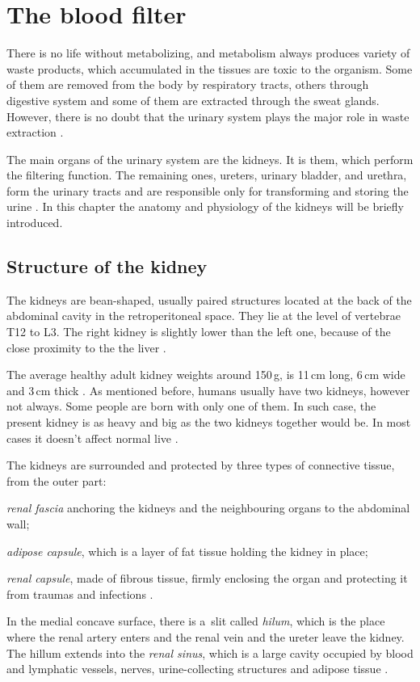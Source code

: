 \chapter{The blood filter}
	
There is no life without metabolizing, and metabolism always produces variety of waste products, which accumulated in the tissues are toxic to the organism. Some of them are removed from the body by respiratory tracts, others through digestive system and some of them are extracted through the sweat glands. However, there is no doubt that the urinary system plays the major role in waste extraction \cite{saladin, health_and_disease}.

The main organs of the urinary system are the kidneys. It is them, which perform the filtering function. The remaining ones,  ureters, urinary bladder, and urethra, form the urinary tracts and are responsible only for transforming and storing the urine \cite{saladin}. In this chapter the anatomy and physiology of the kidneys will be briefly introduced.

\section{Structure of the kidney} 

The kidneys are  bean-shaped, usually paired structures located at the back of the abdominal cavity in the retroperitoneal space. They lie at the level of vertebrae T12 to L3.
The right kidney is slightly lower than the left one, because of the close proximity to the the liver \cite{saladin, health_and_disease}. 

The average healthy adult kidney weights around 150\,g, is 11\,cm long, 6\,cm wide and 3\,cm thick \cite{kidney_dimensions, saladin}. As mentioned before, humans usually have two kidneys, however not always.  Some people are born with only one of them.  In such case, the present kidney is as heavy and big as the two kidneys together would be. In most cases it doesn't affect normal live \cite{onekidney}. 

The kidneys are surrounded and protected by three types of connective tissue, from the outer part: 
\begin{inparaenum}[(1\upshape)]
\item \textit{renal fascia} anchoring the kidneys and the neighbouring organs to the abdominal wall;
\item \textit{adipose capsule}, which is a layer of fat tissue holding the kidney in place;
\item \textit{renal capsule}, made of fibrous tissue, firmly enclosing the organ and protecting it from traumas and infections \cite{saladin, health_and_disease}.
\end{inparaenum} In the medial concave surface, there is a~slit called \textit{hilum}, which is the place where the  renal  artery enters and the renal vein and the ureter leave the kidney. The hillum extends into the \textit{renal sinus}, which is a large cavity occupied by blood and lymphatic vessels, nerves, urine-collecting structures and adipose tissue \cite{health_and_disease}.

